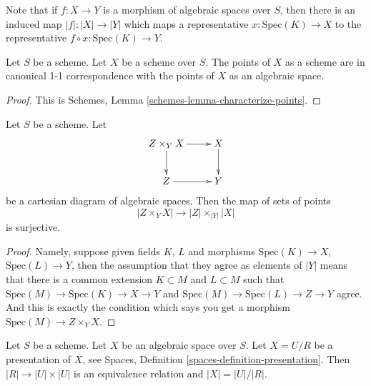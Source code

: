 \noindent
Note that if $f : X \to Y$ is a morphism of algebraic spaces
over $S$, then there is an induced map $|f| : |X| \to |Y|$ which
maps a representative $x : \text{Spec}(K) \to X$ to the representative
$f \circ x : \text{Spec}(K) \to Y$.

\begin{lemma}
\label{lemma-scheme-points}
Let $S$ be a scheme. Let $X$ be a scheme over $S$.
The points of $X$ as a scheme are in canonical 1-1 correspondence
with the points of $X$ as an algebraic space.
\end{lemma}

\begin{proof}
This is Schemes, Lemma \ref{schemes-lemma-characterize-points}.
\end{proof}

\begin{lemma}
\label{lemma-points-cartesian}
Let $S$ be a scheme. Let
$$
\xymatrix{
Z \times_Y X \ar[r] \ar[d] & X \ar[d] \\
Z \ar[r] & Y
}
$$
be a cartesian diagram of algebraic spaces. Then the map of sets
of points
$$
|Z \times_Y X|
\longrightarrow
|Z| \times_{|Y|} |X|
$$
is surjective.
\end{lemma}

\begin{proof}
Namely, suppose given fields $K$, $L$ and morphisms
$\text{Spec}(K) \to X$, $\text{Spec}(L) \to Y$, then the
assumption that they agree as elements of $|Y|$ means that
there is a common extension $K \subset M$ and $L \subset M$
such that
$\text{Spec}(M) \to \text{Spec}(K) \to X \to Y$ and
$\text{Spec}(M) \to \text{Spec}(L) \to Z \to Y$ agree.
And this is exactly the condition which says you get a
morphism $\text{Spec}(M) \to Z \times_Y X$.
\end{proof}

\begin{lemma}
\label{lemma-points-presentation}
Let $S$ be a scheme.
Let $X$ be an algebraic space over $S$.
Let $X = U/R$ be a presentation of $X$, see
Spaces, Definition \ref{spaces-definition-presentation}.
Then $|R| \to |U| \times |U|$ is an equivalence relation
and $|X| = |U|/|R|$.
\end{lemma}

